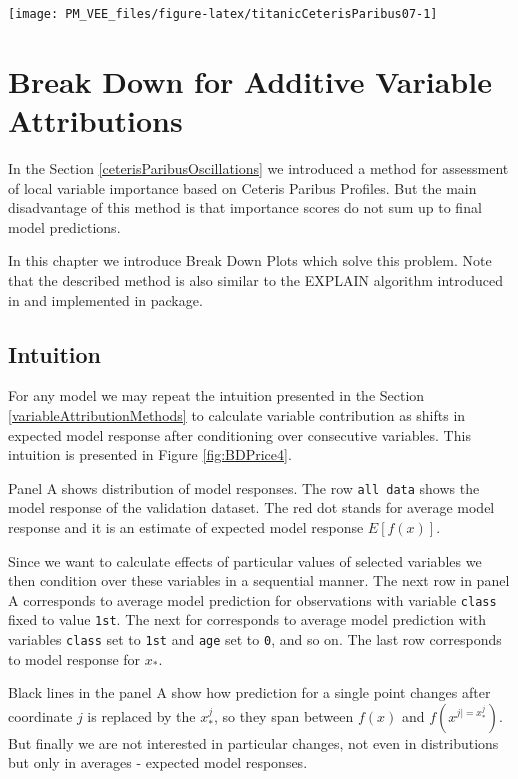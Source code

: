 \documentclass[12pt,]{krantz}
\theoremstyle{definition}
\theoremstyle{definition}
\theoremstyle{definition}
\theoremstyle{remark}
\begin{document}
\begin{center}\texttt{[image: PM\_VEE\_files/figure-latex/titanicCeterisParibus07-1]} \end{center}

\hypertarget{breakDown}{%
\section{Break Down for Additive Variable
Attributions}\label{breakDown}}

In the Section \ref{ceterisParibusOscillations} we introduced a method
for assessment of local variable importance based on Ceteris Paribus
Profiles. But the main disadvantage of this method is that importance
scores do not sum up to final model predictions.

In this chapter we introduce Break Down Plots which solve this problem.
Note that the described method is also similar to the EXPLAIN algorithm
introduced in \citep{explainPaper} and implemented in
\citep{explainPackage} package.

\hypertarget{intuition}{%
\subsection{Intuition}\label{intuition}}

For any model we may repeat the intuition presented in the Section
\ref{variableAttributionMethods} to calculate variable contribution as
shifts in expected model response after conditioning over consecutive
variables. This intuition is presented in Figure \ref{fig:BDPrice4}.

Panel A shows distribution of model responses. The row
\texttt{all\ data} shows the model response of the validation dataset.
The red dot stands for average model response and it is an estimate of
expected model response \(E [f(x)]\).

Since we want to calculate effects of particular values of selected
variables we then condition over these variables in a sequential manner.
The next row in panel A corresponds to average model prediction for
observations with variable \texttt{class} fixed to value \texttt{1st}.
The next for corresponds to average model prediction with variables
\texttt{class} set to \texttt{1st} and \texttt{age} set to \texttt{0},
and so on. The last row corresponds to model response for \(x_*\).

Black lines in the panel A show how prediction for a single point
changes after coordinate \(j\) is replaced by the \(x_*^j\), so they
span between \(f(x)\) and \(f(x^{j|=x_*^j})\). But finally we are not
interested in particular changes, not even in distributions but only in
averages - expected model responses.
\end{document}
